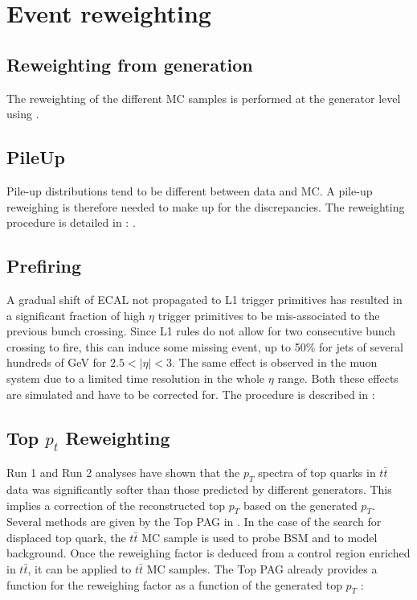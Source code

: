 \documentclass{cernatlasnote}
\begin{document}
\newpage

\section{Event reweighting}
    \label{EVENT_W}
    \subsection{Reweighting from generation}
        The reweighting of the different MC samples is performed at the generator level using \cite{LHEReaderCMSSW}.
    \subsection{PileUp}
        Pile-up distributions tend to be different between data and MC. A pile-up reweighing is therefore needed to make up for the discrepancies. The reweighting procedure is detailed in : \cite{PileupMCReweightingUtilities}.
        
    \subsection{Prefiring}
        A gradual shift of ECAL not propagated to L1 trigger primitives has resulted in a significant fraction of high $\eta$ trigger primitives to be mis-associated to the previous bunch crossing. Since L1 rules do not allow for two consecutive bunch crossing to fire, this can induce some missing event, up to 50\% for jets of several hundreds of GeV for $2.5<|\eta|<3$. The same effect is observed in the muon system due to a limited time resolution in the whole $\eta$ range. Both these effects are simulated and have to be corrected for. The procedure is described in : \cite{L1PrefiringWeightRecipe}
    \subsection{Top $p_{t}$ Reweighting}
            
            Run 1 and Run 2 analyses have shown that the $p_T$ spectra of top quarks in $t\bar{t}$ data was significantly softer than those predicted by different generators. This implies a correction of the reconstructed top $p_T$ based  on the generated $p_T$. Several methods are given by the Top PAG in \cite{TopPtReweighting}. In the case of the search for displaced top quark, the $t\bar{t}$ MC sample is used to probe BSM and to model background. Once the reweighing factor is deduced from a control region enriched in $t\bar{t}$, it can be applied to $t\bar{t}$ MC samples. The Top PAG already provides a function for the reweighing factor as a function of the generated top $p_T$ :
\end{document}
